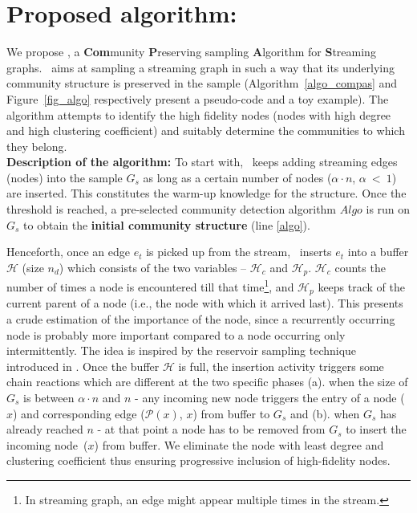
\section{Proposed algorithm: \compas}
\label{algorithm}

We propose \compas, a {\bf Com}munity {\bf P}reserving sampling {\bf A}lgorithm for {\bf S}treaming graphs. \compas~aims at sampling a streaming graph in such a way that its underlying community structure is preserved in the sample (Algorithm~\ref{algo_compas} and Figure~\ref{fig_algo} respectively present a pseudo-code and a toy example). 
The algorithm attempts to identify the high fidelity nodes (nodes with high degree and high clustering coefficient) and suitably determine the communities to which they belong. \\
{\bf Description of the algorithm:} To start with, \compas~keeps adding streaming edges (nodes) into the sample $G_s$ as long as a certain number  of nodes ($\alpha \cdot n$, $\alpha~<~1$) are inserted. 
This constitutes the warm-up knowledge for the structure. 
Once the threshold is reached, a pre-selected community detection algorithm $Algo$ is run on $G_s$ to obtain the {\bf initial community structure} (line \ref{algo}). 

 Henceforth, once an edge $e_t$ is picked up from the stream, \compas~inserts $e_t$ into a buffer $\mathcal{H}$ (size $n_d$) which consists of the two variables -- $\mathcal{H}_c$ and $\mathcal{H}_p$. $\mathcal{H}_c$ counts 
the number of times a node is encountered till that time\footnote{In streaming graph, an edge might appear multiple times in the stream.}, and $\mathcal{H}_p$ keeps track of the current parent of a node (i.e., the node with which it arrived last). %
This presents a crude estimation of the importance of the node, since a recurrently occurring node is probably more important compared to a node occurring only intermittently. The idea is inspired by the reservoir sampling technique introduced in \cite{ahmed2014network}.
Once the buffer $\mathcal{H}$ is full, the insertion activity triggers some chain reactions which are different at the two specific phases 
(a). when the size of $G_s$ is between $\alpha \cdot n$ and $n$  -  any incoming new node triggers the entry of a node ($x$) and corresponding edge ($\mathcal {P}(x)$, $x$)  from buffer to $G_s$ and (b). when $G_s$ has already reached $n$ - at that point a node has to be removed from $G_s$ to insert the incoming node~($x$) from buffer. We eliminate the node with least degree and clustering coefficient thus  ensuring progressive
inclusion of high-fidelity nodes. 

